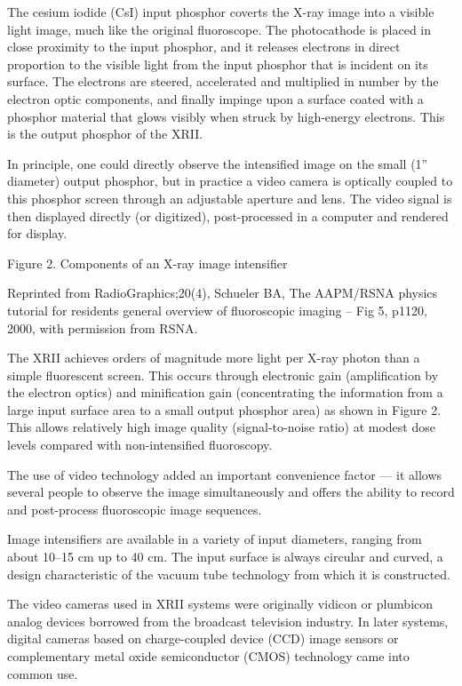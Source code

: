 \documentclass{assignment}
\begin{document}
\begin{problem}
{The cesium iodide (CsI) input phosphor coverts the X-ray image into a visible light image, much like the original fluoroscope. The photocathode is placed in close proximity to the input phosphor, and it releases electrons in direct proportion to the visible light from the input phosphor that is incident on its surface. The electrons are steered, accelerated and multiplied in number by the electron optic components, and finally impinge upon a surface coated with a phosphor material that glows visibly when struck by high-energy electrons. This is the output phosphor of the XRII.

In principle, one could directly observe the intensified image on the small (1” diameter) output phosphor, but in practice a video camera is optically coupled to this phosphor screen through an adjustable aperture and lens. The video signal is then displayed directly (or digitized), post-processed in a computer and rendered for display.

Figure 2. Components of an X-ray image intensifier


Reprinted from RadioGraphics;20(4), Schueler BA, The AAPM/RSNA physics tutorial for residents general overview of fluoroscopic imaging – Fig 5, p1120, 2000, with permission from RSNA.


The XRII achieves orders of magnitude more light per X-ray photon than a simple fluorescent screen. This occurs through electronic gain (amplification by the electron optics) and minification gain (concentrating the information from a large input surface area to a small output phosphor area) as shown in Figure 2. This allows relatively high image quality (signal-to-noise ratio) at modest dose levels compared with non-intensified fluoroscopy.

The use of video technology added an important convenience factor — it allows several people to observe the image simultaneously and offers the ability to record and post-process fluoroscopic image sequences.

Image intensifiers are available in a variety of input diameters, ranging from about 10–15 cm up to 40 cm. The input surface is always circular and curved, a design characteristic of the vacuum tube technology from which it is constructed.

The video cameras used in XRII systems were originally vidicon or plumbicon analog devices borrowed from the broadcast television industry. In later systems, digital cameras based on charge-coupled device (CCD) image sensors or complementary metal oxide semiconductor (CMOS) technology came into common use.

}
\end{problem}
\end{document}

